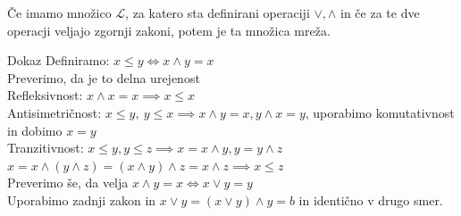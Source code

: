 \documentclass{beamer}
\begin{document}
\begin{frame}
\begin{theorem}
Če imamo množico $\mathcal{L}$, za katero sta definirani operaciji $\lor, \land$ in če za te dve operacji veljajo zgornji zakoni, potem je ta množica mreža.
\end{theorem}
\end{frame}

\begin{frame}

\begin{block}{Dokaz}
\centering Definiramo: $x \leq y \iff x \land y = x$ \\ Preverimo, da je to delna urejenost \\ \pause 
Refleksivnost: $x \land x = x \implies x \leq x$\\ \pause
Antisimetričnost: $x \leq y, \ y \leq x \implies x \land y = x, y \land x = y$, uporabimo komutativnost in dobimo $x = y$\\ \pause
Tranzitivnost:  $x \leq y, y \leq z \implies x = x \land y, y = y \land z$ \\
$x = x \land (y \land z) = (x \land y) \land z = x \land z \implies x \leq z$ \\ \pause
Preverimo še, da velja $x \land y = x \iff x \lor y = y$\\ \pause
Uporabimo zadnji zakon in $x \lor y = (x \lor y) \land y = b$ in identično v drugo smer.
\end{block}


\end{frame}
\end{document}
